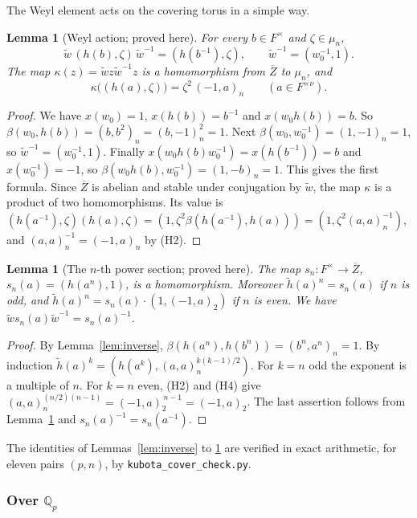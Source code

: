 \documentclass[12pt,letterpaper]{article}
\numberwithin{equation}{section}
\newtheorem{xlemma}[theorem]{Lemma}
\theoremstyle{definition}
\newcommand{\proved}{proved here}
\newcommand{\Q}{\mathbb Q}
\newcommand{\bZ}{\overline{Z}}
\newcommand{\wt}{\tilde w}
\newcommand{\hl}{\tilde h}
\begin{document}
The Weyl element acts on the covering torus in a simple way.

\begin{xlemma}[Weyl action; \proved]\label{lem:weyl}
For every $b\in F^\times$ and $\zeta\in\mu_n$,
\[
\wt\,(h(b),\zeta)\,\wt^{-1}=(h(b^{-1}),\zeta),\qquad \wt^{-1}=(w_0^{-1},1).
\]
The map $\kappa(z)=\wt z\wt^{-1}z$ is a homomorphism from $\bZ$ to $\mu_n$, and
\[
\kappa\bigl((h(a),\zeta)\bigr)=\zeta^2\,(-1,a)_n\qquad(a\in F^{\times\nu}).
\]
\end{xlemma}
\begin{proof}
We have $x(w_0)=1$, $x(h(b))=b^{-1}$ and $x(w_0h(b))=b$.  So
$\beta(w_0,h(b))=(b,b^2)_n=(b,-1)_n^2=1$.  Next
$\beta(w_0,w_0^{-1})=(1,-1)_n=1$, so $\wt^{-1}=(w_0^{-1},1)$.  Finally
$x(w_0h(b)w_0^{-1})=x(h(b^{-1}))=b$ and $x(w_0^{-1})=-1$, so
$\beta(w_0h(b),w_0^{-1})=(1,-b)_n=1$.  This gives the first formula.  Since $\bZ$ is abelian
and stable under conjugation by $\wt$, the map $\kappa$ is a product of two homomorphisms.
Its value is
$(h(a^{-1}),\zeta)(h(a),\zeta)=(1,\zeta^2\beta(h(a^{-1}),h(a)))=(1,\zeta^2(a,a)_n^{-1})$,
and $(a,a)_n^{-1}=(-1,a)_n$ by (H2).
\end{proof}

\begin{xlemma}[The $n$-th power section; \proved]\label{lem:power}
The map $s_n:F^\times\to\bZ$, $s_n(a)=(h(a^n),1)$, is a homomorphism.  Moreover
$\hl(a)^n=s_n(a)$ if $n$ is odd, and $\hl(a)^n=s_n(a)\cdot(1,(-1,a)_2)$ if $n$ is even.
We have $\wt s_n(a)\wt^{-1}=s_n(a)^{-1}$.
\end{xlemma}
\begin{proof}
By Lemma~\ref{lem:inverse}, $\beta(h(a^n),h(b^n))=(b^n,a^n)_n=1$.  By induction
$\hl(a)^k=(h(a^k),(a,a)_n^{k(k-1)/2})$.  For $k=n$ odd the exponent is a multiple of $n$.
For $k=n$ even, (H2) and (H4) give
$(a,a)_n^{(n/2)(n-1)}=(-1,a)_2^{\,n-1}=(-1,a)_2$.  The last assertion follows from
Lemma~\ref{lem:weyl} and $s_n(a)^{-1}=s_n(a^{-1})$.
\end{proof}

The identities of Lemmas~\ref{lem:inverse} to \ref{lem:power} are verified in exact
arithmetic, for eleven pairs $(p,n)$, by \texttt{kubota\_cover\_check.py}.

\subsubsection{\texorpdfstring{Over $\Q_p$}{Over Qp}}\label{subsubsec:overQp}
\end{document}
